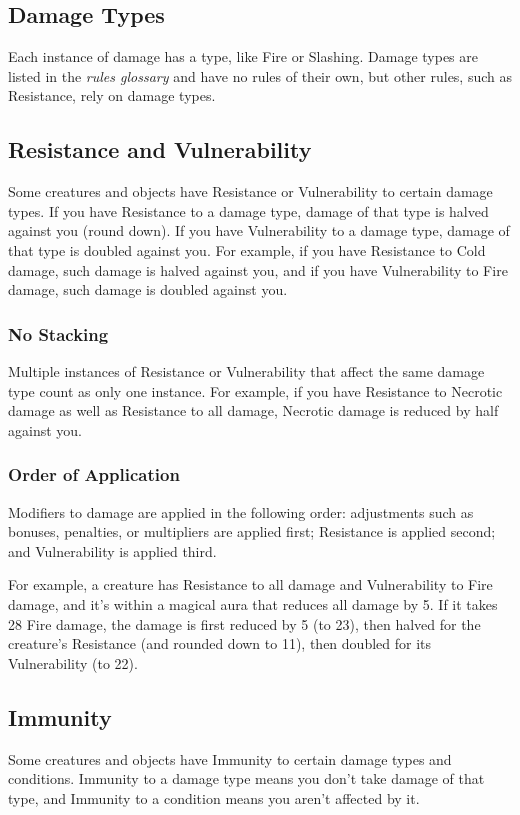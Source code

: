 \documentclass[10pt,a4paper,twoside,bg=print,twocolumn,openany,nodeprecatedcode]{dndbook}
\begin{document}
\subsection{Damage Types}
Each instance of damage has a type, like Fire or Slashing. Damage types are listed in the \textit{rules glossary} and have no rules of their own, but other rules, such as Resistance, rely on damage types.

\subsection{Resistance and Vulnerability}
Some creatures and objects have Resistance or Vulnerability to certain damage types. If you have Resistance to a damage type, damage of that type is halved against you (round down). If you have Vulnerability to a damage type, damage of that type is doubled against you. For example, if you have Resistance to Cold damage, such damage is halved against you, and if you have Vulnerability to Fire damage, such damage is doubled against you.

\subsubsection{No Stacking}
Multiple instances of Resistance or Vulnerability that affect the same damage type count as only one instance. For example, if you have Resistance to Necrotic damage as well as Resistance to all damage, Necrotic damage is reduced by half against you.

\subsubsection{Order of Application}
Modifiers to damage are applied in the following order: adjustments such as bonuses, penalties, or multipliers are applied first; Resistance is applied second; and Vulnerability is applied third.

For example, a creature has Resistance to all damage and Vulnerability to Fire damage, and it's within a magical aura that reduces all damage by 5. If it takes 28 Fire damage, the damage is first reduced by 5 (to 23), then halved for the creature's Resistance (and rounded down to 11), then doubled for its Vulnerability (to 22).

\subsection{Immunity}
Some creatures and objects have Immunity to certain damage types and conditions. Immunity to a damage type means you don't take damage of that type, and Immunity to a condition means you aren't affected by it.
\end{document}
